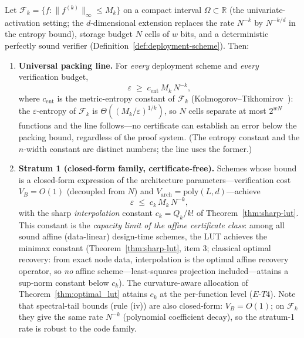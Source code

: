 \setcounter{theorem}{16}
\begin{theorem}
\label{thm:capacity-stratification}
Let $\mathcal{F}_k = \{f : \|f^{(k)}\|_\infty \leq M_k\}$ on a compact
interval $\Omega \subset \mathbb{R}$ (the univariate-activation setting;
the $d$-dimensional extension replaces the rate $N^{-k}$ by
$N^{-k/d}$ in the entropy bound), storage budget $N$ cells of $w$ bits,
and a deterministic perfectly sound verifier
(Definition~\ref{def:deployment-scheme}). Then:

\begin{enumerate}
    \item \textbf{Universal packing line.} For \emph{every} deployment
    scheme and \emph{every} verification budget,
    \begin{equation}
    \varepsilon \;\geq\; c_{\mathrm{ent}}\, M_k\, N^{-k},
    \label{eq:packing-line}
    \end{equation}
    where $c_{\mathrm{ent}}$ is the metric-entropy constant of
    $\mathcal{F}_k$ (Kolmogorov--Tikhomirov~\cite{kolmogorov1959entropy}):
    the $\varepsilon$-entropy of $\mathcal{F}_k$ is
    $\Theta((M_k/\varepsilon)^{1/k})$, so $N$ cells separate at most
    $2^{wN}$ functions and the line follows---no certificate can
    establish an error below the packing bound, regardless of the proof
    system. (The entropy constant and the $n$-width constant are
    distinct numbers; the line uses the former.)

    \item \textbf{Stratum 1 (closed-form family, certificate-free).}
    Schemes whose bound is a closed-form expression of the architecture
    parameters---verification cost $V_B = O(1)$ (decoupled from $N$) and
    $V_{\text{arch}} = \text{poly}(L,d)$---achieve
    \begin{equation}
    \varepsilon \;\leq\; c_k\, M_k\, N^{-k},
    \label{eq:stratum1}
    \end{equation}
    with the sharp \emph{interpolation} constant $c_k = Q_k/k!$ of
    Theorem~\ref{thm:sharp-lut}. This constant is the \emph{capacity
    limit of the affine certificate class}: among all sound affine
    (data-linear) design-time schemes, the LUT achieves the minimax
    constant (Theorem~\ref{thm:sharp-lut}, item 3; classical optimal
    recovery: from exact node data, interpolation is the optimal
    affine recovery operator, so \emph{no} affine scheme---least-squares
    projection included---attains a sup-norm constant below $c_k$).
    The curvature-aware allocation of Theorem~\ref{thm:optimal_lut}
    attains $c_k$ at the per-function level ($E$-$T4$). Note that
    spectral-tail bounds (rule (iv)) are also closed-form:
    $V_B = O(1)$; on $\mathcal{F}_k$ they give the same rate $N^{-k}$
    (polynomial coefficient decay), so the stratum-1 rate is robust to
    the code family.


\end{enumerate}
\end{theorem}

